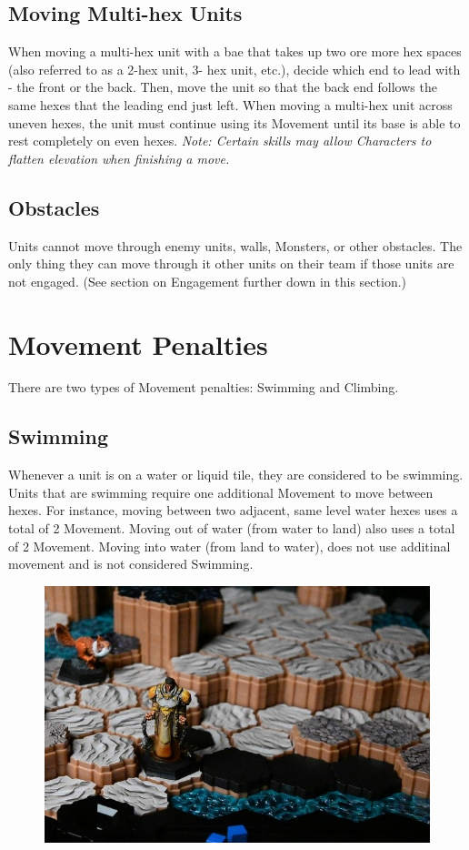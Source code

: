 \documentclass[../main.tex]{subfiles}
\begin{document}
\subsection{Moving Multi-hex Units}
When moving a multi-hex unit with a bae that takes up two ore more hex spaces (also referred to as a 2-hex unit, 3- hex unit, etc.), decide which end to lead with - the front or the back. Then, move the unit so that the back end follows the same hexes that the leading end just left. When moving a multi-hex unit across uneven hexes, the unit must continue using its Movement until its base is able to rest completely on even hexes. 
\textit{Note: Certain skills may allow Characters to flatten elevation when finishing a move.}

\subsection{Obstacles}
Units cannot move through enemy units, walls, Monsters, or other obstacles. The only thing they can move through it other units on their team if those units are not engaged. (See section on Engagement further down in this section.)

\section{Movement Penalties}
There are two types of Movement penalties: Swimming and Climbing. 
\subsection{Swimming}
Whenever a unit is on a water or liquid tile, they are considered to be swimming. Units that are swimming require one additional Movement to move between hexes. For instance, moving between two adjacent, same level water hexes uses a total of 2 Movement. Moving out of water (from water to land) also uses a total of 2 Movement. Moving into water (from land to water), does not use additinal movement and is not considered Swimming. 

\begin{figure}[h]
    \centering
    \includegraphics[width=1\linewidth]{chapters//Movement/TimeStrikeWaterMovement1.jpg}
\end{figure}
\end{document}
